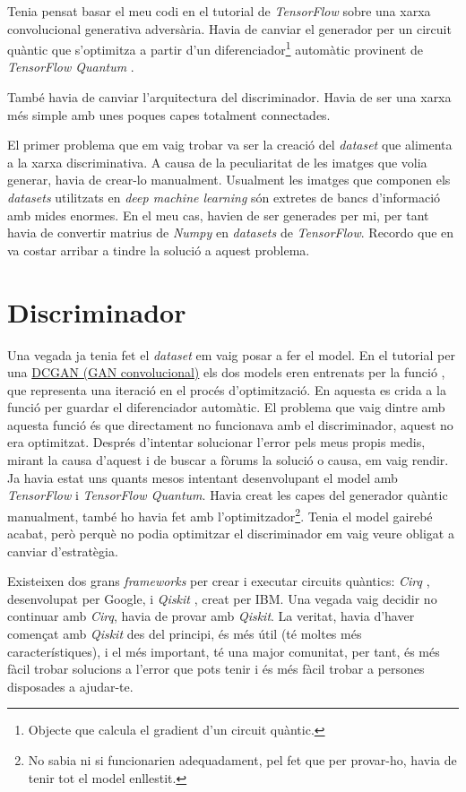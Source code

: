 Tenia pensat basar el meu codi en el tutorial de \textit{TensorFlow} sobre una xarxa convolucional generativa adversària. Havia de canviar el generador per un circuit quàntic que s'optimitza a partir d'un diferenciador\footnote{Objecte que calcula el gradient d'un circuit quàntic.} automàtic provinent de \textit{TensorFlow Quantum} \cite{tfq}. 

També havia de canviar l'arquitectura del discriminador. Havia de ser una xarxa més simple amb unes poques capes totalment connectades.

El primer problema que em vaig trobar va ser la creació del \textit{dataset} que alimenta a la xarxa discriminativa. A causa de la peculiaritat de les imatges que volia generar, havia de crear-lo manualment. Usualment les imatges que componen els \textit{datasets} utilitzats en \textit{deep machine learning} són extretes de bancs d'informació amb mides enormes. En el meu cas, havien de ser generades per mi, per tant havia de convertir matrius de \textit{Numpy} en \textit{datasets} de \textit{TensorFlow}. Recordo que en va costar arribar a tindre la solució a aquest problema. 

\section{Discriminador}

Una vegada ja tenia fet el \textit{dataset} em vaig posar a fer el model. En el tutorial per una \href{https://www.tensorflow.org/tutorials/generative/dcgan}{DCGAN (GAN convolucional)} els dos models eren entrenats per la funció , que representa una iteració en el procés d'optimització. En aquesta es crida a la funció  per guardar el diferenciador automàtic. El problema que vaig dintre amb aquesta funció és que directament no funcionava amb el discriminador, aquest no era optimitzat. Després d'intentar solucionar l'error pels meus propis medis, mirant la causa d'aquest i de buscar a fòrums la solució o causa, em vaig rendir. Ja havia estat uns quants mesos intentant desenvolupant el model amb \textit{TensorFlow} i \textit{TensorFlow Quantum}. Havia creat les capes del generador quàntic manualment, també ho havia fet amb l'optimitzador\footnote{No sabia ni si funcionarien adequadament, pel fet que per provar-ho, havia de tenir tot el model enllestit.}. Tenia el model gairebé acabat, però perquè no podia optimitzar el discriminador em vaig veure obligat a canviar d'estratègia.

Existeixen dos grans \textit{frameworks} per crear i executar circuits quàntics: \textit{Cirq} \cite{cirq}, desenvolupat per Google, i \textit{Qiskit} \cite{qiskit}, creat per IBM. Una vegada vaig decidir no continuar amb \textit{Cirq}, havia de provar amb \textit{Qiskit}. La veritat, havia d'haver començat amb \textit{Qiskit} des del principi, és més útil (té moltes més característiques), i el més important, té una major comunitat, per tant, és més fàcil trobar solucions a l'error que pots tenir i és més fàcil trobar a persones disposades a ajudar-te.

